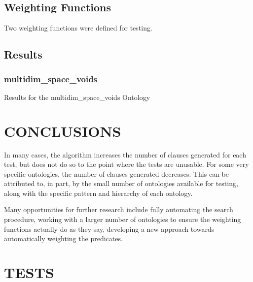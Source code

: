 \documentclass{article}
\begin{document}
\subsection{Weighting Functions}
Two weighting functions were defined for testing. 

\subsection{{Results}}
\subsubsection{multidim\_space\_voids}
\begin{table}[h]
\centering
{}
\caption{Results for the multidim\_space\_voids Ontology}
\end{table}

\newpage
\vspace*{.05in}
\section{\MakeUppercase{Conclusions}}

In many cases, the algorithm increases the number of clauses generated for each test, but does not do so to the point where the tests are unusable. For some very specific ontologies, the number of clauses generated decreases. This can be attributed to, in part, by the small number of ontologies available for testing, along with the specific pattern and hierarchy of each ontology. 

Many opportunities for further research include fully automating the search procedure, working with a larger number of ontologies to ensure the weighting functions actually do as they say, developing a new approach towards automatically weighting the predicates. 
\newpage
{}
\vspace*{.05in}
\printbibliography

\newpage
\appendix
\section{\MakeUppercase{Tests}}
\begin{singlespace}
\end{singlespace}
\end{document}
